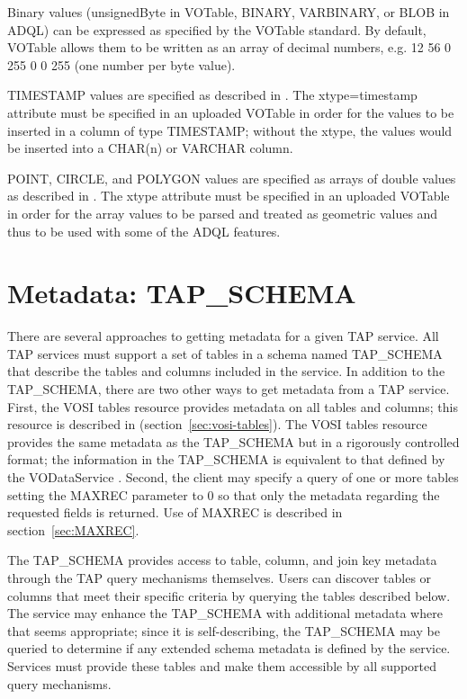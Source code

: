 \documentclass[11pt,letter]{ivoa}
\begin{document}
Binary values (unsignedByte in VOTable, BINARY, VARBINARY, or BLOB in ADQL) can 
be expressed as specified by the VOTable standard. By default, VOTable allows 
them to be written as an array of decimal numbers, e.g. 12 56 0 255 0 0 255 (one 
number per byte value).

TIMESTAMP values are specified as described in \citep{std:DALI}. The 
xtype=timestamp attribute must be specified in an uploaded VOTable in 
order for the values to be inserted in a column of type TIMESTAMP; without the 
xtype, the values would be inserted into a CHAR(n) or VARCHAR column.

POINT, CIRCLE, and POLYGON values are specified as arrays of double values as 
described in \citep{std:DALI}. The xtype attribute must be specified in 
an uploaded VOTable in order for the array values to be parsed and treated as 
geometric values and thus to be used with some of the ADQL features.

\section{Metadata: TAP\_SCHEMA}
\label{sec:tap-schema}

There are several approaches to getting metadata for a given TAP service. All 
TAP services must support a set of tables in a schema named 
TAP\_SCHEMA that describe the tables and columns included in the 
service. In addition to the TAP\_SCHEMA, there are two other ways 
to get metadata from a TAP service. First, the VOSI tables resource provides 
metadata on all tables and columns; this resource is described in 
(section~\ref{sec:vosi-tables}). The 
VOSI tables resource provides the same metadata as the TAP\_SCHEMA 
but in a rigorously controlled format; the information in the 
TAP\_SCHEMA is equivalent to that defined by the  VODataService 
\citep{std:VODS11}. Second, the client may specify a query of one or more 
tables setting the 
MAXREC parameter to 0 so that only the metadata regarding the requested fields 
is returned. Use of MAXREC is described in section~\ref{sec:MAXREC}.

The TAP\_SCHEMA provides access to table, column, and join key 
metadata through the TAP query mechanisms themselves. Users can discover tables 
or columns that meet their specific criteria by querying the tables described 
below.  The service may enhance the TAP\_SCHEMA with additional 
metadata where that seems appropriate; since it is self-describing, the 
TAP\_SCHEMA may be queried to determine if any extended schema 
metadata is defined by the service. Services must provide these tables and make 
them accessible by all supported query mechanisms.
\end{document}
